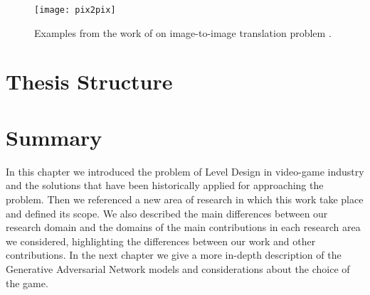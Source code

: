 \begin{figure}[h!]
	\begin{center}
		\texttt{[image: pix2pix]}
	\end{center}
	
	\captionsetup{width=1\linewidth}
	\caption[Pix2Pix example from \citeauthor{image-to-image}]{Examples from the work of \citeauthor{image-to-image} on image-to-image translation problem \cite{image-to-image}.}
	\label{fig:img-to-img}
	\medskip
	
\end{figure}



\section{Thesis Structure}

\section{Summary}
In this chapter we introduced the problem of Level Design in video-game industry and the solutions that have been historically applied for approaching the problem. Then we referenced a new area of research in which this work take place and defined its scope.
We also described the main differences between our research domain and the domains of the main contributions in each research area we considered, highlighting the differences between our work and other contributions. In the next chapter we give a more in-depth description of the Generative Adversarial Network models and considerations about the choice of the game. 
